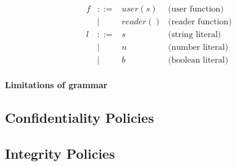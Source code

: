 \[\begin{array}{rcll}
    f           & ::=   & user(s)                           & \text{(user function)} \\
                & |     & reader()                          & \text{(reader function)} \\
    l           & ::=   & s                                 & \text{(string literal)} \\
                & |     & n                                 & \text{(number literal)} \\
                & |     & b                                 & \text{(boolean literal)}
\end{array}
\]

\paragraph{Limitations of grammar}

\subsection{Confidentiality Policies}

\subsection{Integrity Policies}
